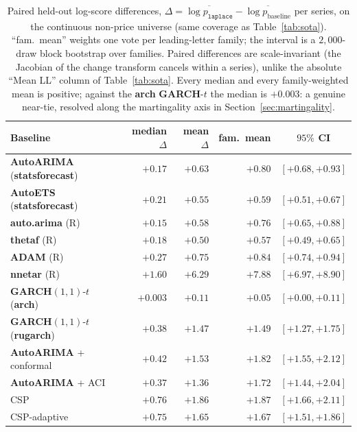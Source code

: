 \documentclass[article]{jss}
\providecommand{\proglang}[1]{\textsf{#1}}
\providecommand{\pkg}[1]{\textbf{#1}}
\providecommand{\code}[1]{\texttt{#1}}
\begin{document}
\begin{table}[t!]
\centering
\small
\setlength{\tabcolsep}{5pt}
\begin{tabular}{lrrrc}
\toprule
Baseline & median $\Delta$ & mean $\Delta$ & fam.\ mean & $95\%$ CI \\
\midrule
\pkg{AutoARIMA} (\pkg{statsforecast}) & $+0.17$ & $+0.63$ & $+0.80$ & $[+0.68, +0.93]$ \\
\pkg{AutoETS} (\pkg{statsforecast})   & $+0.21$ & $+0.55$ & $+0.59$ & $[+0.51, +0.67]$ \\
\pkg{auto.arima} (\proglang{R})       & $+0.15$ & $+0.58$ & $+0.76$ & $[+0.65, +0.88]$ \\
\pkg{thetaf} (\proglang{R})           & $+0.18$ & $+0.50$ & $+0.57$ & $[+0.49, +0.65]$ \\
\pkg{ADAM} (\proglang{R})             & $+0.27$ & $+0.75$ & $+0.84$ & $[+0.74, +0.94]$ \\
\pkg{nnetar} (\proglang{R})           & $+1.60$ & $+6.29$ & $+7.88$ & $[+6.97, +8.90]$ \\
\pkg{GARCH}$(1,1)$-$t$ (\pkg{arch})   & $+0.003$ & $+0.11$ & $+0.05$ & $[+0.00, +0.11]$ \\
\pkg{GARCH}$(1,1)$-$t$ (\pkg{rugarch})& $+0.38$ & $+1.47$ & $+1.49$ & $[+1.27, +1.75]$ \\
\pkg{AutoARIMA} + conformal            & $+0.42$ & $+1.53$ & $+1.82$ & $[+1.55, +2.12]$ \\
\pkg{AutoARIMA} + ACI                  & $+0.37$ & $+1.36$ & $+1.72$ & $[+1.44, +2.04]$ \\
CSP                                    & $+0.76$ & $+1.86$ & $+1.87$ & $[+1.66, +2.11]$ \\
CSP-adaptive                           & $+0.75$ & $+1.65$ & $+1.67$ & $[+1.51, +1.86]$ \\
\bottomrule
\end{tabular}
\caption{Paired held-out log-score differences,
$\Delta = \overline{\log p_{\code{laplace}}} - \overline{\log p_{\text{baseline}}}$
per series, on the continuous non-price universe (same coverage as
Table~\ref{tab:sota}). ``fam.\ mean'' weights one vote per leading-letter
family; the interval is a $2{,}000$-draw block bootstrap over families. Paired
differences are scale-invariant (the Jacobian of the change transform cancels
within a series), unlike the absolute ``Mean LL'' column of
Table~\ref{tab:sota}. Every median and every family-weighted mean is positive;
against the \pkg{arch} \pkg{GARCH}-$t$ the median is $+0.003$: a genuine
near-tie, resolved along the martingality axis in
Section~\ref{sec:martingality}.}
\label{tab:paired}
\end{table}
\end{document}

